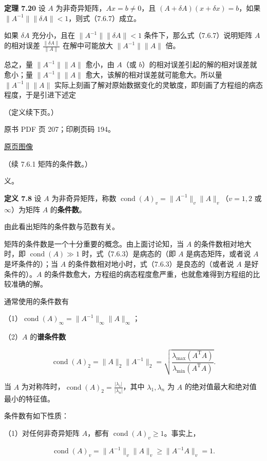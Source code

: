 \textbf{定理 7.20} 设 \(A\) 为非奇异矩阵，\(Ax=b\neq0\)，且 \((A+\delta A)(x+\delta x)=b\)，如果 \(\|A^{-1}\|\|\delta A\|<1\)，则式（7.6.7）成立。

如果 \(\delta A\) 充分小，且在 \(\|A^{-1}\|\|\delta A\|<1\) 条件下，那么式（7.6.7）说明矩阵 \(A\) 的相对误差 \(\frac{\|\delta A\|}{\|A\|}\) 在解中可能放大 \(\|A^{-1}\|\|A\|\) 倍。

总之，量 \(\|A^{-1}\|\|A\|\) 愈小，由 \(A\)（或 \(b\)）的相对误差引起的解的相对误差就愈小；量 \(\|A^{-1}\|\|A\|\) 愈大，该解的相对误差就可能愈大。所以量 \(\|A^{-1}\|\|A\|\) 实际上刻画了解对原始数据变化的灵敏度，即刻画了方程组的病态程度，于是引进下述定

（定义续下页。）

\clearpage

原书 PDF 页 207；印刷页码 194。

\href{source-images/pdf-207.jpeg}{原页图像}

（续 7.6.1 矩阵的条件数。）

义。

\textbf{定义 7.8} 设 \(A\) 为非奇异矩阵，称数 \(\operatorname{cond}(A)_v=\|A^{-1}\|_v\|A\|_v\)（\(v=1,2\) 或 \(\infty\)）为矩阵 \(A\) 的\textbf{条件数}。

由此看出矩阵的条件数与范数有关。

矩阵的条件数是一个十分重要的概念。由上面讨论知，当 \(A\) 的条件数相对地大时，即 \(\operatorname{cond}(A)\gg1\) 时，式（7.6.3）是病态的（即 \(A\) 是病态矩阵，或者说 \(A\) 是坏条件的）；当 \(A\) 的条件数相对地小时，式（7.6.3）是良态的（或者说 \(A\) 是好条件的）。\(A\) 的条件数愈大，方程组的病态程度愈严重，也就愈难得到方程组的比较准确的解。

通常使用的条件数有

（1）\(\operatorname{cond}(A)_\infty=\|A^{-1}\|_\infty\|A\|_\infty\)；

（2）\(A\) 的\textbf{谱条件数}

\[
\operatorname{cond}(A)_2=\|A\|_2\|A^{-1}\|_2
=\sqrt{\frac{\lambda_{\max}(A^{\mathrm T}A)}{\lambda_{\min}(A^{\mathrm T}A)}}.
\]

当 \(A\) 为对称阵时，\(\operatorname{cond}(A)_2=\frac{|\lambda_1|}{|\lambda_n|}\)，其中 \(\lambda_1,\lambda_n\) 为 \(A\) 的绝对值最大和绝对值最小的特征值。

条件数有如下性质：

（1）对任何非奇异矩阵 \(A\)，都有 \(\operatorname{cond}(A)_v\geqslant1\)。事实上，

\[
\operatorname{cond}(A)_v=\|A^{-1}\|_v\|A\|_v\geqslant\|A^{-1}A\|_v=1.
\]

